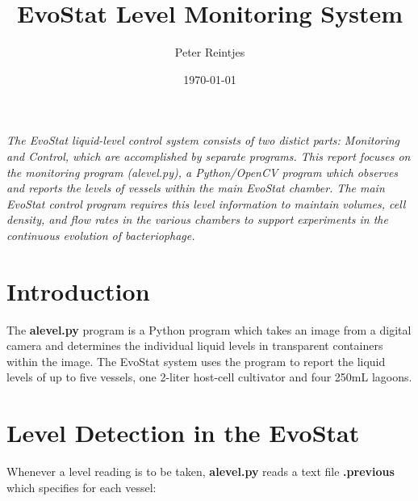 \documentclass[10pt,letterpaper]{article}
\date{}
\begin{document}
\title{EvoStat Level Monitoring System}
\author{Peter Reintjes}
\date{\today}
\maketitle

\vspace*{0.2in}
\begin{flushleft}
\texttt{[image: \{phagestat]}.jpg}
\end{flushleft}

{\it The EvoStat liquid-level control system consists of two distict parts: Monitoring and Control, which are accomplished by separate programs.  This report focuses on the monitoring program (alevel.py), a Python/OpenCV\cite{opencv} program which observes and reports the levels of vessels within the main EvoStat chamber.  The main EvoStat control program requires this level information to maintain volumes, cell density, and flow rates in the various chambers to support experiments in the continuous evolution of bacteriophage\cite{pace}.}

\section*{Introduction}

The {\bf alevel.py} program is a Python program which takes an image from a digital camera and determines the individual liquid levels in transparent containers within the image.  The EvoStat system uses the program to report the liquid levels of up to five vessels, one 2-liter host-cell cultivator and four 250mL lagoons.

\section*{Level Detection in the EvoStat}
Whenever a level reading is to be taken, {\bf alevel.py} reads a text file {\bf .previous} which specifies for each vessel:
\end{document}
